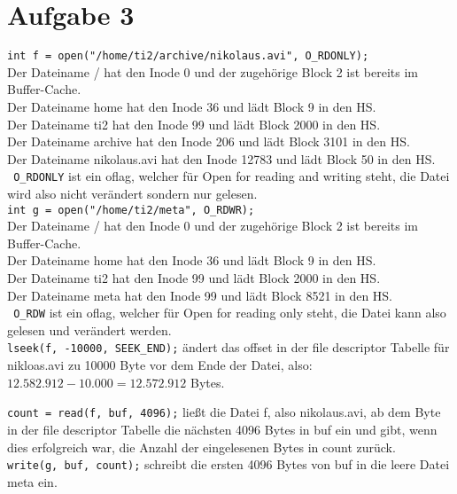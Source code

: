\documentclass{ti2}
\begin{document}
\section*{Aufgabe 3}

\texttt{int f = open("/home/ti2/archive/nikolaus.avi", O\_RDONLY);}\\
Der Dateiname / hat den Inode 0 und der zugehörige Block 2 ist bereits im Buffer-Cache.\\
Der Dateiname home hat den Inode 36 und lädt Block 9 in den HS.\\
Der Dateiname ti2 hat den Inode 99 und lädt Block 2000 in den HS.\\
Der Dateiname archive hat den Inode 206 und lädt Block 3101 in den HS.\\
Der Dateiname nikolaus.avi hat den Inode 12783 und lädt Block 50 in den HS.\\
\texttt{ O\_RDONLY} ist ein oflag, welcher für Open for reading and writing steht, die Datei wird also nicht verändert sondern nur gelesen.\\

\texttt{int g = open("/home/ti2/meta", O\_RDWR);}\\
Der Dateiname / hat den Inode 0 und der zugehörige Block 2 ist bereits im Buffer-Cache.\\
Der Dateiname home hat den Inode 36 und lädt Block 9 in den HS.\\
Der Dateiname ti2 hat den Inode 99 und lädt Block 2000 in den HS.\\
Der Dateiname meta hat den Inode 99 und lädt Block 8521 in den HS.\\
\texttt{ O\_RDW} ist ein oflag, welcher für Open for reading only steht, die Datei kann also gelesen und verändert werden.\\

\texttt{lseek(f, -10000, SEEK\_END);} ändert das offset in der file descriptor Tabelle für nikloas.avi zu 10000 Byte vor dem Ende der Datei, also: $12.582.912 - 10.000 = 12.572.912$ Bytes.\

\texttt{count = read(f, buf, 4096);} ließt die Datei f, also nikolaus.avi, ab dem Byte in der file descriptor Tabelle die nächsten 4096 Bytes in buf ein und gibt, wenn dies erfolgreich war, die Anzahl der eingelesenen Bytes in count zurück.\\

\texttt{write(g, buf, count);} schreibt die ersten 4096 Bytes von buf in die leere Datei meta ein.
\end{document}
